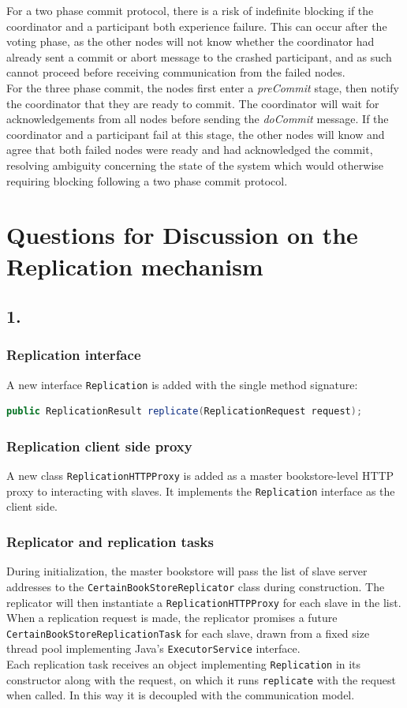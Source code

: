\documentclass[12pt]{article}
\begin{document}
For a two phase commit protocol, there is a risk of indefinite blocking if the coordinator and a participant both experience failure. This can occur after the voting phase, as the other nodes will not know whether the coordinator had already sent a commit or abort message to the crashed participant, and as such cannot proceed before receiving communication from the failed nodes. \\
For the three phase commit, the nodes first enter a \emph{preCommit} stage, then notify the coordinator that they are ready to commit. The coordinator will wait for acknowledgements from all nodes before sending the \emph{doCommit} message. If the coordinator and a participant fail at this stage, the other nodes will know and agree that both failed nodes were ready and had acknowledged the commit, resolving ambiguity concerning the state of the system which would otherwise requiring blocking following a two phase commit protocol.

\section*{Questions for Discussion on the Replication mechanism}

\subsection*{1.}
\subsubsection*{Replication interface}
A new interface \verb|Replication| is added with the single method signature:
\begin{lstlisting}[language=Java]
public ReplicationResult replicate(ReplicationRequest request);
\end{lstlisting}
\subsubsection*{Replication client side proxy}
A new class \verb|ReplicationHTTPProxy| is added as a master bookstore-level HTTP proxy to interacting with slaves. It implements the \verb|Replication| interface as the client side.
\subsubsection*{Replicator and replication tasks}
During initialization, the master bookstore will pass the list of slave server addresses to the \verb|CertainBookStoreReplicator| class during construction. The replicator will then instantiate a \verb|ReplicationHTTPProxy| for each slave in the list. When a replication request is made, the replicator promises a future \verb|CertainBookStoreReplicationTask| for each slave, drawn from a fixed size thread pool implementing Java's \verb|ExecutorService| interface. \\
Each replication task receives an object implementing \verb|Replication| in its constructor along with the request, on which it runs \verb|replicate| with the request when called. In this way it is decoupled with the communication model.
\end{document}

